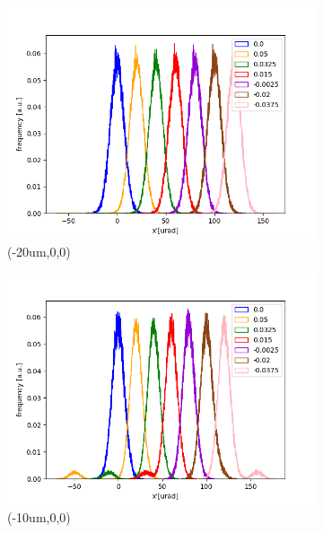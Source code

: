 \documentclass[a4paper]{article}
\begin{document}
\begin{figure}[H]
	
    \centering
	\begin{subfigure}{0.4\textwidth}
		\includegraphics[width=\textwidth]{-20um.png}
		\caption{(-20um,0,0)}
	\end{subfigure}
	\vspace{2em}
	\begin{subfigure}{0.4\textwidth}
		\includegraphics[width=\textwidth]{-10um.png}
        \caption{(-10um,0,0)}
	\end{subfigure}
	\vspace{2em}
	\begin{subfigure}{0.4\textwidth}

\end{subfigure}
\end{figure}
\end{document}
